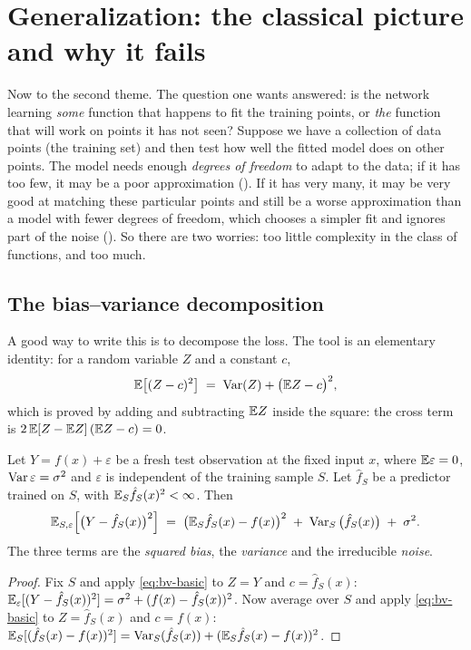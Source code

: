 
\section{Generalization: the classical picture and why it fails}\label{sec:L3-classical}
Now to the second theme. The question one wants answered: is the network learning \emph{some} function that happens to fit the training points, or \emph{the} function that will work on points it has not seen? Suppose we have a collection of data points (the training set) and then
test how well the fitted model does on other points. The model needs enough \emph{degrees of freedom} to adapt to the data; if it has too few, it may be a poor approximation (). If it has very many, it may be very good at matching these particular points and still be a worse approximation than a model with fewer degrees of freedom,
which chooses a simpler fit and ignores part of the noise (). So there are two worries: too little complexity in the class of functions, and too much.

\subsection{The bias--variance decomposition}\label{sec:L3-biasvar}
A good way to write this is to decompose the loss. The tool is an elementary identity: for a random variable $Z$ and a constant $c$,
\begin{equation}\label{eq:bv-basic}
  \mathbb{E}\big[(Z-c)^2\big]\;=\;\operatorname{Var}(Z)+\big(\mathbb{E} Z-c\big)^2 ,
\end{equation}
which is proved by adding and subtracting $\mathbb{E} Z$ inside the square: the cross term is $2\,\mathbb{E}[Z-\mathbb{E} Z]\,(\mathbb{E} Z-c)=0$.

\begin{lem}\label{lem:biasvar}
Let $Y=f(x)+\varepsilon$ be a fresh test observation at the fixed input $x$, where $\mathbb{E}\varepsilon=0$, $\operatorname{Var}\varepsilon=\sigma^2$ and $\varepsilon$ is independent of the training sample $S$. Let $\hat f_S$ be a predictor trained on $S$, with $\mathbb{E}_S\hat f_S(x)^2<\infty$. Then
\[
  \mathbb{E}_{S,\varepsilon}\Big[\big(Y-\hat f_S(x)\big)^2\Big]\;=\;\big(\mathbb{E}_S\hat f_S(x)-f(x)\big)^2\;+\;\operatorname{Var}_S\big(\hat f_S(x)\big)\;+\;\sigma^2 .
\]
The three terms are the \emph{squared bias}, the \emph{variance} and the irreducible \emph{noise}.
\end{lem}
\begin{proof}
Fix $S$ and apply \eqref{eq:bv-basic} to $Z=Y$ and $c=\hat f_S(x)$: $\mathbb{E}_\varepsilon[(Y-\hat f_S(x))^2]=\sigma^2+(f(x)-\hat f_S(x))^2$. Now average over $S$ and apply \eqref{eq:bv-basic} to $Z=\hat f_S(x)$ and $c=f(x)$:
$\mathbb{E}_S[(\hat f_S(x)-f(x))^2]=\operatorname{Var}_S(\hat f_S(x))+(\mathbb{E}_S\hat f_S(x)-f(x))^2$.
\end{proof}

